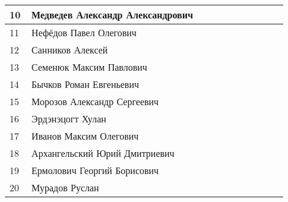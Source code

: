 \documentclass[a4paper,11pt]{article}
\newcommand*\ok{&{\small \ding{51}}} %
\newcommand*\no{&{\small }} %
\begin{document}
\begin{tabular}{p{7pt}|l|p{\CS}|p{\CS}|p{\CS}|p{\CS}|p{\CS}|p{\CS}|p{\CS}|p{\CS}|p{\CS}}
10\,&Медведев Александр Александрович      &\ok\ok\no&&&&\\
\midrule
11\,&Нефёдов Павел Олегович                &\ok\no\no&&&&\\
12\,&Санников Алексей                      &\ok\no\no&&&&\\
13\,&Семенюк Максим Павлович               &\no\no\ok&&&&\\
14\,&Бычков Роман Евгеньевич               &\no\no\ok&&&&\\
15\,&Морозов Александр Сергеевич           &\no\no\no&&&&\\
\midrule
16\,&Эрдэнэцогт Хулан                      &\no\ok\ok&&&&\\
17\,&Иванов Максим Олегович                &\no\no\no&&&&\\
18\,&Архангельский Юрий Дмитриевич         &\no\no\ok&&&&\\ 
19\,&Ермолович Георгий Борисович           &\no\no\no&&&&\\
20\,& Мурадов Руслан                       &\no\no\no&&&&\\
\bottomrule
\end{tabular} 
\end{document}
